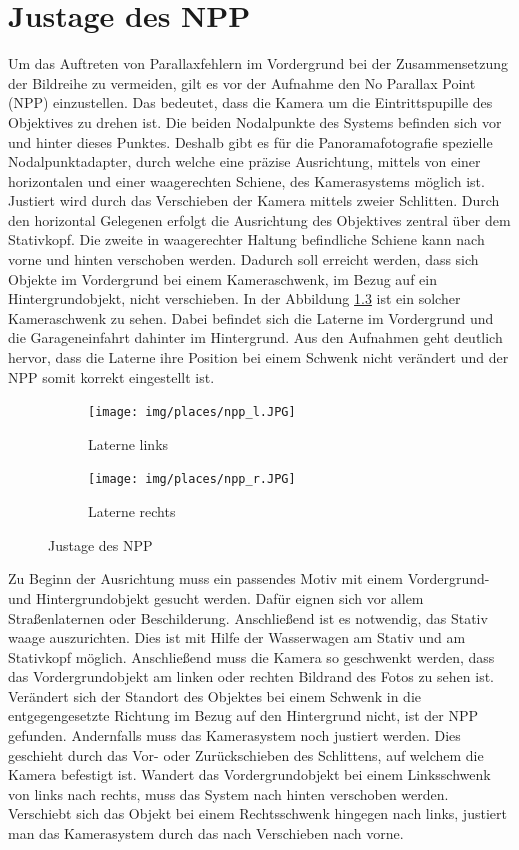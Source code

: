 \documentclass[liststotoc,bibtotoc,fontsize=14pt,]{scrreprt}
\begin{document}
	\chapter{Justage des NPP}
	\label{sec:npp}
	Um das Auftreten von Parallaxfehlern im Vordergrund bei der Zusammensetzung der Bildreihe zu vermeiden, gilt es vor der Aufnahme den No Parallax Point (NPP) einzustellen. Das bedeutet, dass die Kamera um die Eintrittspupille des Objektives zu drehen ist. Die beiden Nodalpunkte des Systems befinden sich vor und hinter dieses Punktes. Deshalb gibt es für die Panoramafotografie spezielle Nodalpunktadapter, durch welche eine präzise Ausrichtung, mittels von einer horizontalen und einer waagerechten Schiene, des Kamerasystems möglich ist.
	\bigskip
	Justiert wird durch das Verschieben der Kamera mittels zweier Schlitten. Durch den horizontal Gelegenen erfolgt die Ausrichtung des Objektives zentral über dem Stativkopf. Die zweite in waagerechter Haltung befindliche Schiene kann nach vorne und hinten verschoben werden. Dadurch soll erreicht werden, dass sich Objekte im Vordergrund bei einem Kameraschwenk, im Bezug auf ein Hintergrundobjekt, nicht verschieben. In der Abbildung \ref{fig:justage} ist ein solcher Kameraschwenk zu sehen. Dabei befindet sich die Laterne im Vordergrund und die Garageneinfahrt dahinter im Hintergrund. Aus den Aufnahmen geht deutlich hervor, dass die Laterne ihre Position bei einem Schwenk nicht verändert und der NPP somit korrekt eingestellt ist.
	
	\begin{figure}[H]
		\begin{subfigure}[b]{0.5\textwidth}
			\texttt{[image: img/places/npp\_l.JPG]}
			\caption{Laterne links}
			\label{fig:npp_l}
		\end{subfigure}
		\hfill
		\begin{subfigure}[b]{0.5\textwidth}
			\texttt{[image: img/places/npp\_r.JPG]}
			\caption{Laterne rechts}
			\label{fig:npp_r}
		\end{subfigure}
		\caption{Justage des NPP}
		\label{fig:justage}
	\end{figure}
	\bigskip
	
	Zu Beginn der Ausrichtung muss ein passendes Motiv mit einem Vordergrund- und Hintergrundobjekt gesucht werden. Dafür eignen sich vor allem Straßenlaternen oder Beschilderung. Anschließend ist es notwendig, das Stativ waage auszurichten. Dies ist mit Hilfe der Wasserwagen am Stativ und am Stativkopf möglich. Anschließend muss die Kamera so geschwenkt werden, dass das Vordergrundobjekt am linken oder rechten Bildrand des Fotos zu sehen ist. Verändert sich der Standort des Objektes bei einem Schwenk in die entgegengesetzte Richtung im Bezug auf den Hintergrund nicht, ist der NPP gefunden. 
	Andernfalls muss das Kamerasystem noch justiert werden. Dies geschieht durch das Vor- oder Zurückschieben des Schlittens, auf welchem die Kamera befestigt ist. Wandert das Vordergrundobjekt bei einem Linksschwenk von links nach rechts, muss das System nach hinten verschoben werden. Verschiebt sich das Objekt bei einem Rechtsschwenk hingegen nach links, justiert man das Kamerasystem durch das nach Verschieben nach vorne.
	
\end{document}
